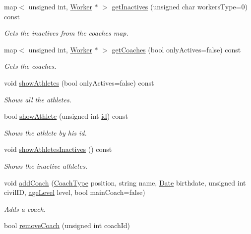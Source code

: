 \begin{DoxyCompactItemize}
map$<$ unsigned int, \hyperlink{class_worker}{Worker} $\ast$ $>$ \hyperlink{class_club_a8daf0174b3d095cf6c8480f9bf3ab0e8}{get\+Inactives} (unsigned char workers\+Type=0) const
\begin{DoxyCompactList}\small\item\em Gets the inactives from the coaches map. \end{DoxyCompactList}\item 
map$<$ unsigned int, \hyperlink{class_worker}{Worker} $\ast$ $>$ \hyperlink{class_club_ad93b5a4d38cc3af7decf777a47a26880}{get\+Coaches} (bool only\+Actives=false) const
\begin{DoxyCompactList}\small\item\em Gets the coaches. \end{DoxyCompactList}\item 
void \hyperlink{class_club_ab74a638a755a3d7b1239f418f8257c19}{show\+Athletes} (bool only\+Actives=false) const
\begin{DoxyCompactList}\small\item\em Shows all the athletes. \end{DoxyCompactList}\item 
bool \hyperlink{class_club_a0a4b9097d0be7470b4a547c13a86adcb}{show\+Athlete} (unsigned int \hyperlink{_training_8hpp_aa44c715f606358e721f7911b15a1cfc5a280d7329079c73a4a5df3f35697b60b1}{id}) const
\begin{DoxyCompactList}\small\item\em Shows the athlete by his id. \end{DoxyCompactList}\item 
void \hyperlink{class_club_a55d6ed46c6d937143172a01ac8ddf7cc}{show\+Athletes\+Inactives} () const
\begin{DoxyCompactList}\small\item\em Shows the inactive athletes. \end{DoxyCompactList}\item 
void \hyperlink{class_club_ab75ce29b014480adce6c4628c1dd8e0b}{add\+Coach} (\hyperlink{_utils_8hpp_ad6bce769911d709b802464c1ec12e7ad}{Coach\+Type} position, string name, \hyperlink{class_date}{Date} birthdate, unsigned int civil\+ID, \hyperlink{_utils_8hpp_a226b190c54f09ab6ba8ac83b28e3c4b6}{age\+Level} level, bool main\+Coach=false)
\begin{DoxyCompactList}\small\item\em Adds a coach. \end{DoxyCompactList}\item 
bool \hyperlink{class_club_adf82412445e01740989ee1956b13a556}{remove\+Coach} (unsigned int coach\+Id)

\end{DoxyCompactItemize}
